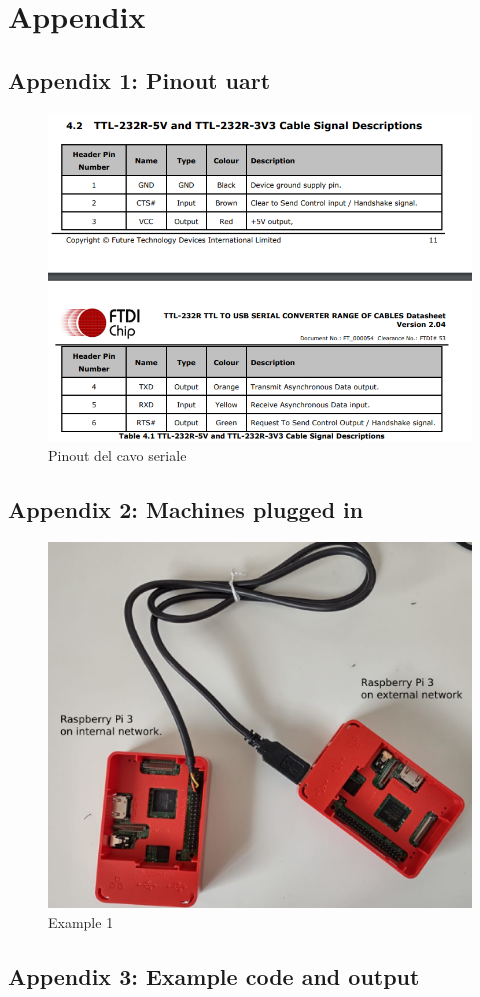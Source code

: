 \documentclass[a4paper,11pt]{scrartcl}
\begin{document}
\section{Appendix}
\subsection{Appendix 1: Pinout uart}
\begin{figure}[htbp]
\centerline{\includegraphics{pinout uart.png}}
\caption{Pinout del cavo seriale}
\label{fig2}
\end{figure}

\subsection{Appendix 2: Machines plugged in}
\begin{figure}[htbp]
\centerline{\includegraphics{0.0.1.png}}
\caption{Example 1}
\label{fig}
\end{figure}

\subsection{Appendix 3: Example code and output}



\end{document}
